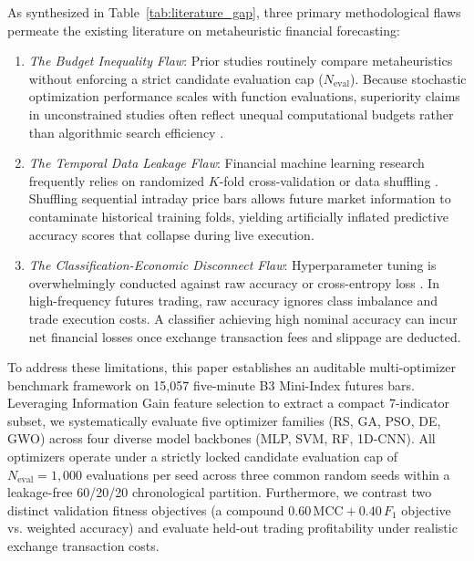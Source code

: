 As synthesized in Table~\ref{tab:literature_gap}, three primary methodological flaws permeate the existing literature on metaheuristic financial forecasting:
\begin{enumerate}
    \item \textit{The Budget Inequality Flaw}: Prior studies routinely compare metaheuristics without enforcing a strict candidate evaluation cap ($N_{\mathrm{eval}}$). Because stochastic optimization performance scales with function evaluations, superiority claims in unconstrained studies often reflect unequal computational budgets rather than algorithmic search efficiency \cite{dhingra2025solar, ecer2020mlp_ga_pso}.
    \item \textit{The Temporal Data Leakage Flaw}: Financial machine learning research frequently relies on randomized $K$-fold cross-validation or data shuffling \cite{simatupang2026stock, makridakis2018statistical}. Shuffling sequential intraday price bars allows future market information to contaminate historical training folds, yielding artificially inflated predictive accuracy scores that collapse during live execution.
    \item \textit{The Classification-Economic Disconnect Flaw}: Hyperparameter tuning is overwhelmingly conducted against raw accuracy or cross-entropy loss \cite{chicco2020mcc, souza2025iccsa}. In high-frequency futures trading, raw accuracy ignores class imbalance and trade execution costs. A classifier achieving high nominal accuracy can incur net financial losses once exchange transaction fees and slippage are deducted.
\end{enumerate}

To address these limitations, this paper establishes an auditable multi-optimizer benchmark framework on 15,057 five-minute B3 Mini-Index futures bars. Leveraging Information Gain feature selection to extract a compact 7-indicator subset, we systematically evaluate five optimizer families (RS, GA, PSO, DE, GWO) across four diverse model backbones (MLP, SVM, RF, 1D-CNN). All optimizers operate under a strictly locked candidate evaluation cap of $N_{\mathrm{eval}} = 1{,}000$ evaluations per seed across three common random seeds within a leakage-free 60/20/20 chronological partition. Furthermore, we contrast two distinct validation fitness objectives (a compound $0.60\,\mathrm{MCC} + 0.40\,F_1$ objective vs. weighted accuracy) and evaluate held-out trading profitability under realistic exchange transaction costs.
